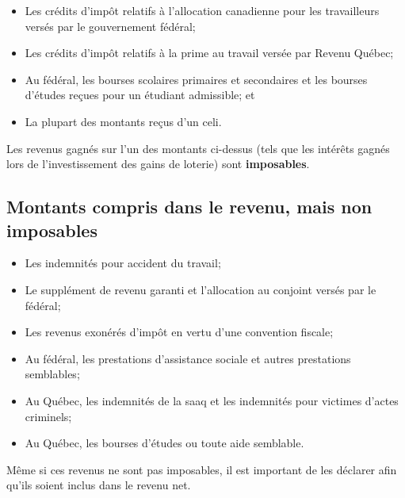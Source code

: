 \begin{itemize}
	\item Les crédits d'impôt relatifs à l'allocation canadienne pour les travailleurs  versés par le gouvernement fédéral;
	\item Les crédits d'impôt relatifs à la prime au travail versée par Revenu Québec;
	\item Au fédéral, les bourses scolaires primaires et secondaires et les bourses d'études reçues pour un étudiant admissible; et
	\item La plupart des montants reçus d'un \acrfull{celi}.
\end{itemize}
\begin{note}
	Les revenus gagnés sur l'un des montants ci-dessus (tels que les intérêts gagnés lors de l'investissement des gains de loterie) sont \textbf{imposables}.
\end{note}


\subsection{Montants compris dans le revenu, mais non imposables}
\begin{itemize}
	\item Les indemnités pour accident du travail;
	\item Le supplément de revenu garanti et l'allocation au conjoint versés par le fédéral;
	\item Les revenus exonérés d'impôt en vertu d'une convention fiscale;
	\item Au fédéral, les prestations d'assistance sociale et autres prestations semblables;
	\item Au Québec, les indemnités de la \acrfull{saaq} et les indemnités pour victimes d'actes criminels;
	\item Au Québec, les bourses d'études ou toute aide semblable.
\end{itemize}
\begin{note}
	Même si ces revenus ne sont pas imposables, il est important de les déclarer afin qu'ils soient inclus dans le revenu net.
\end{note}



